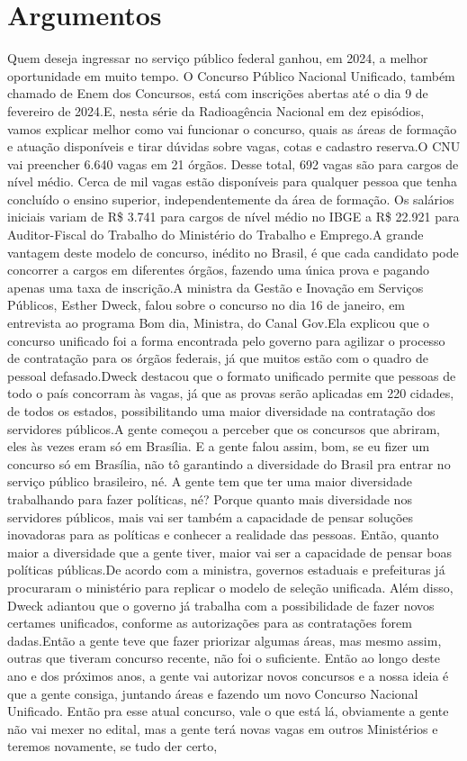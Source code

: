 \documentclass[
   article,       
   12pt,          
   oneside,       
   a4paper,       
   english,       
   brazil,        
   sumario=tradicional
   ]{abntex2}
\begin{document}
\section{Argumentos}
Quem deseja ingressar no serviço público federal ganhou, em 2024, a melhor oportunidade em muito tempo. O Concurso Público Nacional Unificado, também chamado de Enem dos Concursos, está com inscrições abertas até o dia 9 de fevereiro de 2024.E, nesta série da Radioagência Nacional em dez episódios, vamos explicar melhor como vai funcionar o concurso, quais as áreas de formação e atuação disponíveis e tirar dúvidas sobre vagas, cotas e cadastro reserva.O CNU vai preencher 6.640 vagas em 21 órgãos. Desse total, 692 vagas são para cargos de nível médio. Cerca de mil vagas estão disponíveis para qualquer pessoa que tenha concluído o ensino superior, independentemente da área de formação. Os salários iniciais variam de R\$ 3.741 para cargos de nível médio no IBGE a R\$ 22.921 para Auditor-Fiscal do Trabalho do Ministério do Trabalho e Emprego.A grande vantagem deste modelo de concurso, inédito no Brasil, é que cada candidato pode concorrer a cargos em diferentes órgãos, fazendo uma única prova e pagando apenas uma taxa de inscrição.A ministra da Gestão e Inovação em Serviços Públicos, Esther Dweck, falou sobre o concurso no dia 16 de janeiro, em entrevista ao programa Bom dia, Ministra, do Canal Gov.Ela explicou que o concurso unificado foi a forma encontrada pelo governo para agilizar o processo de contratação para os órgãos federais, já que muitos estão com o quadro de pessoal defasado.Dweck destacou que o formato unificado permite que pessoas de todo o país concorram às vagas, já que as provas serão aplicadas em 220 cidades, de todos os estados, possibilitando uma maior diversidade na contratação dos servidores públicos.\textquotedbl{}A gente começou a perceber que os concursos que abriram, eles às vezes eram só em Brasília. E a gente falou assim, bom, se eu fizer um concurso só em Brasília, não tô garantindo a diversidade do Brasil pra entrar no serviço público brasileiro, né. A gente tem que ter uma maior diversidade trabalhando para fazer políticas, né? Porque quanto mais diversidade nos servidores públicos, mais vai ser também a capacidade de pensar soluções inovadoras para as políticas e conhecer a realidade das pessoas. Então, quanto maior a diversidade que a gente tiver, maior vai ser a capacidade de pensar boas políticas públicas.\textquotedbl{}De acordo com a ministra, governos estaduais e prefeituras já procuraram o ministério para replicar o modelo de seleção unificada. Além disso, Dweck adiantou que o governo já trabalha com a possibilidade de fazer novos certames unificados, conforme as autorizações para as contratações forem dadas.\textquotedbl{}Então a gente teve que fazer priorizar algumas áreas, mas mesmo assim, outras que tiveram concurso recente, não foi o suficiente. Então ao longo deste ano e dos próximos anos, a gente vai autorizar novos concursos e a nossa ideia é que a gente consiga, juntando áreas e fazendo um novo Concurso Nacional Unificado. Então pra esse atual concurso, vale o que está lá, obviamente a gente não vai mexer no edital, mas a gente terá novas vagas em outros Ministérios e teremos novamente, se tudo der certo, 
\end{document}
